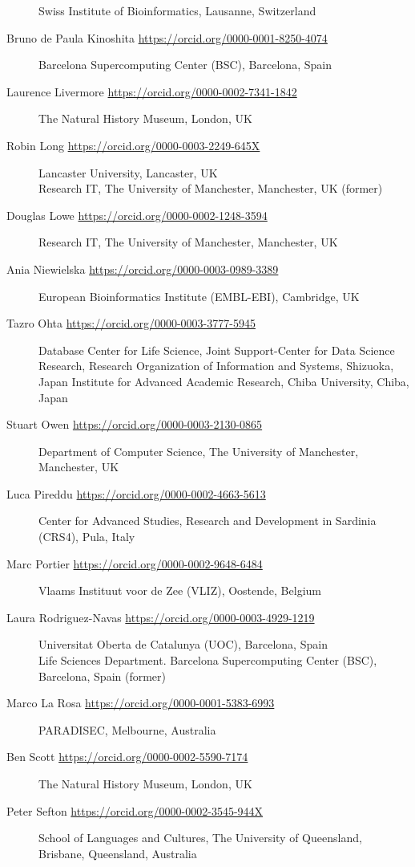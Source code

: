\begin{flushleft}
\begin{description}
Swiss Institute of Bioinformatics, Lausanne, Switzerland
\item[Bruno de Paula Kinoshita \url{https://orcid.org/0000-0001-8250-4074}]
Barcelona Supercomputing Center (BSC), Barcelona, Spain
\item[Laurence Livermore \url{https://orcid.org/0000-0002-7341-1842}]
The Natural History Museum, London, UK
\item[Robin Long \url{https://orcid.org/0000-0003-2249-645X}]
Lancaster University, Lancaster, UK\\
Research IT, The University of Manchester, Manchester, UK (former)
\item[Douglas Lowe \url{https://orcid.org/0000-0002-1248-3594}]
Research IT, The University of Manchester, Manchester, UK
\item[Ania Niewielska \url{https://orcid.org/0000-0003-0989-3389}]
European Bioinformatics Institute (EMBL-EBI), Cambridge, UK
\item[Tazro Ohta \url{https://orcid.org/0000-0003-3777-5945}]
Database Center for Life Science, Joint Support-Center for Data Science Research, Research Organization of Information and Systems, Shizuoka, Japan
Institute for Advanced Academic Research, Chiba University, Chiba, Japan
\item[Stuart Owen \url{https://orcid.org/0000-0003-2130-0865}]
Department of Computer Science, The University of Manchester,
Manchester, UK
\item[Luca Pireddu \url{https://orcid.org/0000-0002-4663-5613}]
Center for Advanced Studies, Research and Development in Sardinia
(CRS4), Pula, Italy
\item[Marc Portier \url{https://orcid.org/0000-0002-9648-6484}]
Vlaams Instituut voor de Zee (VLIZ), Oostende, Belgium
\item[Laura Rodriguez-Navas \url{https://orcid.org/0000-0003-4929-1219}]
Universitat Oberta de Catalunya (UOC), Barcelona, Spain\\
Life Sciences Department. Barcelona Supercomputing Center (BSC),
Barcelona, Spain (former)
\item[Marco La Rosa \url{https://orcid.org/0000-0001-5383-6993}]
PARADISEC, Melbourne, Australia
\item[Ben Scott \url{https://orcid.org/0000-0002-5590-7174}]
The Natural History Museum, London, UK
\item[Peter Sefton \url{https://orcid.org/0000-0002-3545-944X}]
School of Languages and Cultures, The
University of Queensland, Brisbane, Queensland, Australia\\

\end{description}
\end{flushleft}
